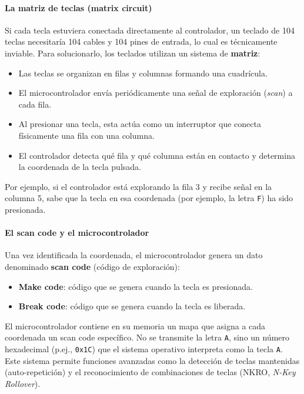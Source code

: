 \documentclass[12pt, letterpaper]{article}
\begin{document}
\paragraph{La matriz de teclas (matrix circuit)}
Si cada tecla estuviera conectada directamente al controlador, un teclado de 104 teclas necesitaría 104 cables y 104 pines de entrada, lo cual es técnicamente inviable. Para solucionarlo, los teclados utilizan un sistema de \textbf{matriz}:
\begin{itemize}
    \item Las teclas se organizan en filas y columnas formando una cuadrícula.
    \item El microcontrolador envía periódicamente una señal de exploración (\textit{scan}) a cada fila.
    \item Al presionar una tecla, esta actúa como un interruptor que conecta físicamente una fila con una columna.
    \item El controlador detecta qué fila y qué columna están en contacto y determina la coordenada de la tecla pulsada.
\end{itemize}
Por ejemplo, si el controlador está explorando la fila 3 y recibe señal en la columna 5, sabe que la tecla en esa coordenada (por ejemplo, la letra \texttt{F}) ha sido presionada.

\paragraph{El scan code y el microcontrolador}
Una vez identificada la coordenada, el microcontrolador genera un dato denominado \textbf{scan code} (código de exploración):
\begin{itemize}
    \item \textbf{Make code}: código que se genera cuando la tecla es presionada.
    \item \textbf{Break code}: código que se genera cuando la tecla es liberada.
\end{itemize}
El microcontrolador contiene en su memoria un mapa que asigna a cada coordenada un scan code específico. No se transmite la letra \texttt{A}, sino un número hexadecimal (p.ej., \texttt{0x1C}) que el sistema operativo interpreta como la tecla \texttt{A}. Este sistema permite funciones avanzadas como la detección de teclas mantenidas (auto-repetición) y el reconocimiento de combinaciones de teclas (NKRO, \textit{N-Key Rollover}).
\end{document}
